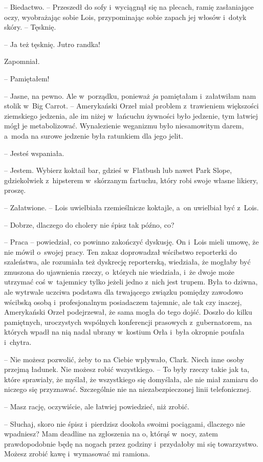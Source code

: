 \documentclass[oneside,polish,11pt,sfheadings]{mwbk}
\begin{document}
-- Biedactwo. -- Przeszedł do sofy i~wyciągnął się na plecach, ramię
zasłaniające oczy, wyobrażając sobie Lois, przypominając sobie zapach
jej włosów i~dotyk skóry. -- Tęsknię.

-- Ja też tęsknię. Jutro randka!

Zapomniał. 

-- Pamiętałem!

-- Jasne, na pewno. Ale w~porządku, ponieważ \textit{ja} pamiętałam i~załatwiłam nam stolik w~Big Carrot. -- Amerykański Orzeł miał problem z~trawieniem większości ziemskiego jedzenia, ale im niżej w~łańcuchu
żywności było jedzenie, tym łatwiej mógł je metabolizować. Wynalezienie
weganizmu było niesamowitym darem, a~moda na surowe jedzenie była
ratunkiem dla jego jelit.

-- Jesteś wspaniała.

-- Jestem. Wybierz koktail bar, gdzieś w~Flatbush lub nawet Park Slope,
gdziekolwiek z~hipsterem w~skórzanym fartuchu, który robi swoje własne
likiery, proszę.

-- Załatwione. -- Lois uwielbiała rzemieślnicze koktajle, a~on uwielbiał
być z~Lois.

-- Dobrze, dlaczego do cholery nie śpisz tak późno, co?

-- Praca -- powiedział, co powinno zakończyć dyskusję. On i~Lois mieli
umowę, że nie mówił o~swojej pracy. Ten zakaz doprowadzał wścibstwo
reporterki do szaleństwa, ale rozumiała też dyskrecję reporterską,
wiedziała, że mogłaby być zmuszona do ujawnienia rzeczy, o~których nie
wiedziała, i~że dwoje może utrzymać coś w~tajemnicy tylko jeżeli jedno z~nich jest trupem. Była to dziwna, ale wytrwale uczciwa podstawa dla
trwającego związku pomiędzy zawodowo wścibską osobą i~profesjonalnym
posiadaczem tajemnic, ale tak czy inaczej, Amerykański Orzeł
podejrzewał, że sama mogła do tego dojść. Doszło do kilku pamiętnych,
uroczystych wspólnych konferencji prasowych z~gubernatorem, na których
wpadł na nią nadal ubrany w~kostium Orła i~była okropnie poufała i~chytra.

-- Nie możesz pozwolić, żeby to na Ciebie wpływało, Clark. Niech inne
osoby przejmą ładunek. Nie możesz robić wszystkiego. -- To były rzeczy
takie jak ta, które sprawiały, że myślał, że wszystkiego się domyślała,
ale nie miał zamiaru do niczego się przyznawać. Szczególnie nie na
niezabezpieczonej linii telefonicznej.

-- Masz rację, oczywiście, ale łatwiej powiedzieć, niż zrobić.

-- Słuchaj, skoro nie śpisz i~pierdzisz dookoła swoimi pociągami,
dlaczego nie wpadniesz? Mam deadline na zgłoszenia na o, którąś w~nocy,
zatem prawdopodobnie będę na nogach przez godziny i~przydałoby mi się
towarzystwo. Możesz zrobić kawę i~wymasować mi ramiona.
\end{document}
